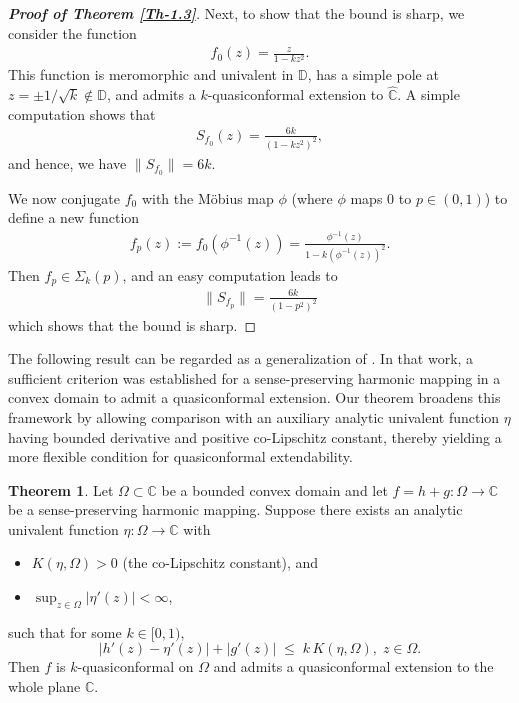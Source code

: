 \documentclass[a4paper,12pt]{amsart}
\theoremstyle{plain}
\theoremstyle{definition}
\newtheorem{thm}{Theorem}[section]
\begin{document}
\begin{proof}[\bf {Proof of Theorem \ref{Th-1.3}}]
	 Next, to show that the bound is sharp, we consider the function
	\begin{align*}
		 f_0(z) = \frac{z}{1 - k z^2}.
	\end{align*}
	 This function is meromorphic and univalent in \( \mathbb{D} \), has a simple pole at \( z = \pm 1/{\sqrt{k}} \notin \mathbb{D} \), and admits a \( k \)-quasiconformal extension to \( \widehat{\mathbb{C}} \). A simple computation shows that
	 \begin{align*}
	 	S_{f_0}(z) = \frac{6k}{(1 - k z^2)^2},
	 \end{align*}
	 and hence, we have $\| S_{f_0} \| = 6k$.
	 
	 We now conjugate $f_0$ with the Möbius map $\phi$ (where $\phi$ maps $0$ to $p \in (0,1)$) to define a new function
	 \begin{align*}
	 	f_p(z) := f_0(\phi^{-1}(z)) = \frac{\phi^{-1}(z)}{1 - k (\phi^{-1}(z))^2}.
	 \end{align*}
	 Then \( f_p \in \Sigma_k(p) \), and an easy computation leads to
	\begin{align*}
		\| S_{f_p} \| = \frac{6k}{(1 - p^2)^2}
	\end{align*}
	which shows that the bound is sharp.
\end{proof}
The following result can be regarded as a generalization of \cite[Theorem 1]{Bhowmik-Satapati-Complex Sgn-2024}. In that work, a sufficient criterion was established for a sense-preserving harmonic mapping in a convex domain to admit a quasiconformal extension. Our theorem broadens this framework by allowing comparison with an auxiliary analytic univalent function $\eta$ having bounded derivative and positive co-Lipschitz constant, thereby yielding a more flexible condition for quasiconformal extendability.
\begin{thm}\label{Thm-1.4}
	Let $\Omega \subset \mathbb{C}$ be a bounded convex domain and let $f=h+g:\Omega\to\mathbb{C}$ be a sense-preserving harmonic mapping. Suppose there exists an analytic univalent function $\eta:\Omega\to\mathbb{C}$ with
	\begin{itemize}
		\item[(i)] $K(\eta,\Omega)>0$ (the co-Lipschitz constant), and
		\item[(ii)] $\displaystyle\sup_{z\in\Omega}|\eta'(z)|<\infty$,
	\end{itemize}
	such that for some $k\in[0,1)$,
	\begin{equation}
		|h'(z)-\eta'(z)|+|g'(z)| \;\le\; k\,K(\eta,\Omega),\; z\in\Omega.
	\end{equation}
	Then $f$ is $k$-quasiconformal on $\Omega$ and admits a quasiconformal extension to the whole plane $\mathbb{C}$.
\end{thm}
\end{document}
